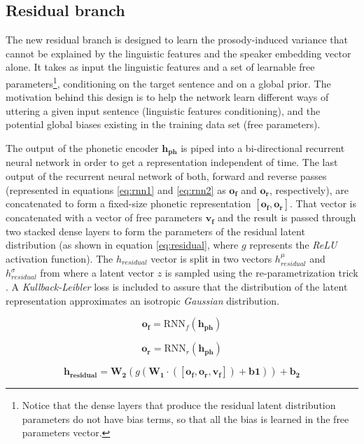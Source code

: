 \subsection{Residual branch}
The new residual branch is designed to learn the prosody-induced variance that cannot be explained by the linguistic features and the speaker embedding vector alone. It takes as input the linguistic features and a set of learnable free parameters\footnote{Notice that the dense layers that produce the residual latent distribution parameters do not have bias terms, so that all the bias is learned in the free parameters vector.}, conditioning on the target sentence and on a global prior. The motivation behind this design is to help the network learn different ways of uttering a given input sentence (linguistic features conditioning), and the potential global biases existing in the training data set (free parameters).

The output of the phonetic encoder $\mathbf{h_{\text{ph}}}$ is piped into a bi-directional recurrent neural network \autocite{schuster1997,graves2005} in order to get a representation independent of time. The last output of the recurrent neural network of both, forward and reverse passes (represented in equations \ref{eq:rnn1} and \ref{eq:rnn2} as $\mathbf{o_f}$ and $\mathbf{o_r}$, respectively), are  concatenated to form a fixed-size phonetic representation $[\mathbf{o_f}, \mathbf{o_r}]$. That vector is concatenated with a vector of free parameters $\mathbf{v_f}$ and the result is passed through two stacked dense layers to form the parameters of the residual latent distribution (as shown in equation \ref{eq:residual}, where $g$ represents the \textit{ReLU} activation function). The $h_{residual}$ vector is split in two vectors $h_{residual}^{\mu}$ and $h_{residual}^{\sigma}$ from where a latent vector $z$ is sampled using the re-parametrization trick \autocite{kingma2019}. A \textit{Kullback-Leibler} loss is included to assure that the distribution of the latent representation approximates an isotropic \textit{Gaussian} distribution.

\begin{equation}
 \label{eq:rnn1}
\mathbf{o_f} = \text{RNN}_f(\mathbf{h_{ph}})
\end{equation}

\begin{equation}
 \label{eq:rnn2}
\mathbf{o_r} = \text{RNN}_r(\mathbf{h_{ph}})
\end{equation}

\begin{equation}
 \label{eq:residual}
\mathbf{h_{residual}} = \mathbf{W_2}(g(\mathbf{W_1}\cdot([\mathbf{o_f}, \mathbf{o_r}, \mathbf{v_f}]) + \mathbf{b1} )) +\mathbf{ b_2}
\end{equation}

